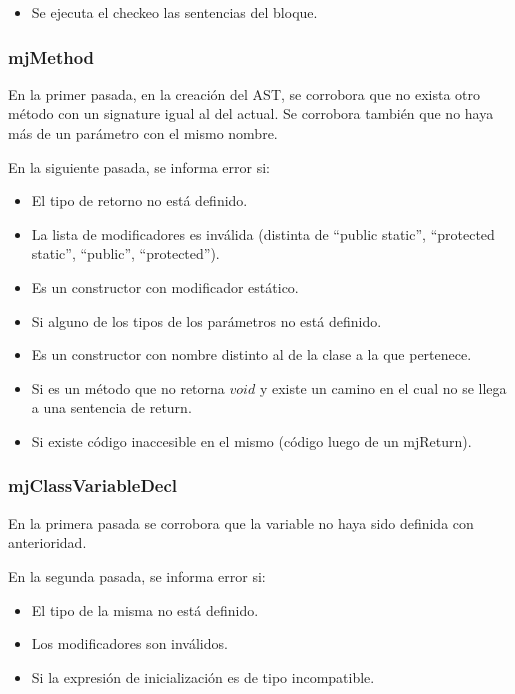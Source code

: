 \documentclass [a4paper,abstracton,titlepage]{scrartcl}
\begin{document}
  \begin{itemize}
    \item Se ejecuta el checkeo las sentencias del bloque.
  \end{itemize}

  \subsubsection{mjMethod}

  En la primer pasada, en la creación del AST, se corrobora que no exista otro
método con un signature igual al del actual. Se corrobora también que no haya
más de un parámetro con el mismo nombre.

  En la siguiente pasada, se informa error si:

  \begin{itemize}
   \item El tipo de retorno no está definido.
   \item La lista de modificadores es inválida (distinta de ``public static'',
``protected static'', ``public'', ``protected'').
   \item Es un constructor con modificador estático.
   \item Si alguno de los tipos de los parámetros no está definido.
   \item Es un constructor con nombre distinto al de la clase a la que
pertenece.
   \item Si es un método que no retorna $void$ y existe un camino en el cual no
se llega a una sentencia de return.
   \item Si existe código inaccesible en el mismo (código luego de un mjReturn).
  \end{itemize}

  \subsubsection{mjClassVariableDecl}

En la primera pasada se corrobora que la variable no haya sido definida con
anterioridad.

En la segunda pasada, se informa error si:

  \begin{itemize}
   \item El tipo de la misma no está definido.
   \item Los modificadores son inválidos.
   \item Si la expresión de inicialización es de tipo incompatible.
  \end{itemize}
\end{document}

